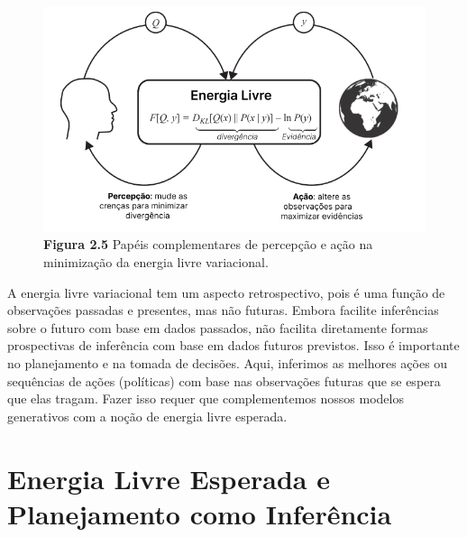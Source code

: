 \documentclass[
  12pt,
]{book}
\begin{document}
\begin{figure}
\centering
\includegraphics{images/Figura_2_5.png}
\caption{\textbf{Figura 2.5} Papéis complementares de percepção e ação na minimização da energia livre variacional.}
\end{figure}

A energia livre variacional tem um aspecto retrospectivo, pois é uma função de observações passadas e presentes, mas não futuras. Embora facilite inferências sobre o futuro com base em dados passados, não facilita diretamente formas prospectivas de inferência com base em dados futuros previstos. Isso é importante no planejamento e na tomada de decisões. Aqui, inferimos as melhores ações ou sequências de ações (políticas) com base nas observações futuras que se espera que elas tragam. Fazer isso requer que complementemos nossos modelos generativos com a noção de energia livre esperada.

\hypertarget{energia-livre-esperada-e-planejamento-como-inferuxeancia}{%
\section{Energia Livre Esperada e Planejamento como Inferência}\label{energia-livre-esperada-e-planejamento-como-inferuxeancia}}
\end{document}
